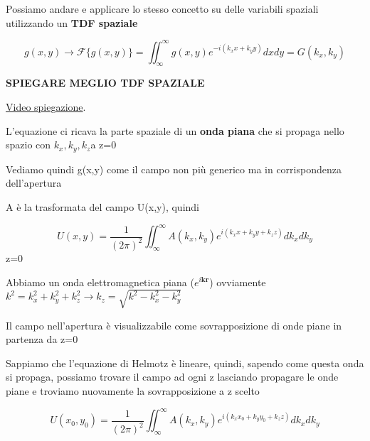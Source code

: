 \documentclass{article}
\begin{document}
Possiamo andare e applicare lo stesso concetto su delle variabili spaziali utilizzando un \textbf{TDF spaziale} 


\begin{equation}
g(x,y) \longrightarrow\mathscr{F} 	 \{g(x,y)\} =\iint_{\infty}^{\infty} g(x,y) e^{-i( k_{x} x +k_{y} y)}dxdy =G(k_{x}, k_{y})
\end{equation}


\textbf{ SPIEGARE MEGLIO TDF SPAZIALE}













\href{https://www.youtube.com/watch?v=y5zQTmkY7GI}{Video spiegazione}.  %











L'equazione ci ricava la parte spaziale di un \textbf{onda piana} che si propaga nello spazio con $k_{x},k_{y},k_{z} $a z=0

Vediamo quindi g(x,y) come il campo non più generico ma in corrispondenza dell'apertura

A è la trasformata del campo U(x,y), quindi

\begin{equation}
U(x,y)=\frac{1}{(2\pi)^{2}}\iint_{\infty}^{\infty} A(k_{x},k_{y}) e^{i( k_{x} x +k_{y} y +k_{z} z)}dk_{x}dk_{y} 		
\end{equation}
z=0

Abbiamo un onda elettromagnetica piana ($ e^{i \textbf{k} \textbf{r}}$) ovviamente  $k ^{2} = k_{x} ^{2} +k_{y} ^{2} +k_{z}^{2} \longrightarrow k_{z}=\sqrt{k ^{2} - k_{x} ^{2} - k_{y} ^{2}}$ 


Il campo nell'apertura è visualizzabile come sovrapposizione di onde piane in partenza da z=0

Sappiamo che l'equazione di Helmotz è lineare, quindi, sapendo come questa onda si propaga, possiamo trovare il campo ad ogni z lasciando propagare le onde piane e troviamo nuovamente la sovrapposizione a z scelto


\begin{equation}
U(x_{0},y_{0})=\frac{1}{(2\pi)^{2}}\iint_{\infty}^{\infty} A(k_{x},k_{y} ) e^{i( k_{x} x_{0} +k_{y} y_{0} +k_{z} z)}dk_{x}dk_{y} 				
\end{equation}
\end{document}
